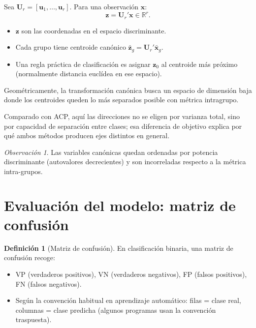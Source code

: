 \documentclass[12pt, a4paper]{article}
\theoremstyle{plain}
\theoremstyle{definition}
\newtheorem{definicion}[teorema]{Definición}
\theoremstyle{remark}
\newtheorem*{observacion}{Observación}
\newcommand{\R}{\mathbb{R}}
\newcommand{\mat}[1]{\mathbf{#1}}
\begin{document}
Sea $\mat{U}_r=[\mathbf{u}_1,\dots,\mathbf{u}_r]$.
Para una observación $\mathbf{x}$:
\[
  \mathbf{z}=\mat{U}_r'\mathbf{x}\in\R^r.
\]

\begin{itemize}
  \item $\mathbf{z}$ son las coordenadas en el espacio discriminante.
  \item Cada grupo tiene centroide canónico
        $\bar{\mathbf{z}}_g=\mat{U}_r'\bar{\mathbf{x}}_g$.
  \item Una regla práctica de clasificación es asignar $\mathbf{z}_0$
        al centroide más próximo (normalmente distancia euclídea en ese espacio).
\end{itemize}

Geométricamente, la transformación canónica busca un espacio de dimensión baja
donde los centroides queden lo más separados posible con métrica intragrupo.

Comparado con ACP, aquí las direcciones no se eligen por varianza total, sino
por capacidad de separación entre clases; esa diferencia de objetivo explica
por qué ambos métodos producen ejes distintos en general.

\begin{observacion}
Las variables canónicas quedan ordenadas por potencia discriminante
(autovalores decrecientes) y son incorreladas respecto a la métrica
intra-grupos.
\end{observacion}

\section{Evaluación del modelo: matriz de confusión}

\begin{definicion}[Matriz de confusión]
En clasificación binaria, una matriz de confusión recoge:
\begin{itemize}
  \item VP (verdaderos positivos), VN (verdaderos negativos),
        FP (falsos positivos), FN (falsos negativos).
  \item Según la convención habitual en aprendizaje automático:
        filas = clase real, columnas = clase predicha
        (algunos programas usan la convención traspuesta).
\end{itemize}
\end{definicion}
\end{document}
